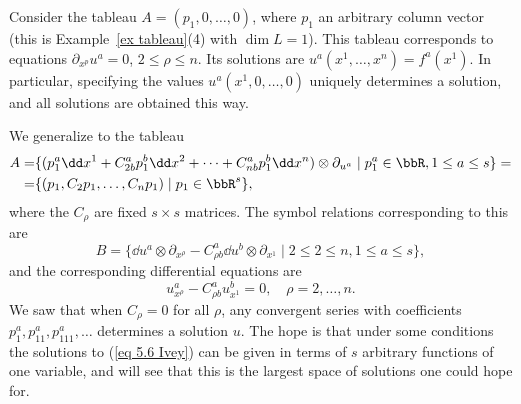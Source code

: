 \begin{example}\label{ex first example Ivey}

Consider the tableau $A=(p_1,0,\ldots,0)$, where $p_1$ an arbitrary column vector (this is Example~\ref{ex tableau}(4) with $\dim L=1$). This tableau corresponds to equations $\partial_{x^p}u^a=0$, $2\leq \rho\leq n$. Its solutions are $u^a(x^1,\ldots,x^n)=f^a(x^1)$. In particular, specifying the values $u^a(x^1,0,\ldots,0)$ uniquely determines a solution, and all solutions are obtained this way.

We generalize to the tableau 
\begin{align}
    A=&\{(p_1^a\dd x^1+C_{2b}^a p_1^b\dd x^2+\cdots +C^a_{nb}p^b_1\dd x^n)\otimes \partial_{u^a}\mid p_1^a\in\bbR,1\leq a\leq s\}= \notag\\
    =& \{(p_1,C_2p_1,\ldots,C_np_1)\mid p_1\in\bbR^s\},\label{eq 5.5 Ivey}
\end{align}
where the $C_\rho$ are fixed $s\times s$ matrices. The symbol relations corresponding to this are 
\[B=\{\dd u^a\otimes \partial_{x^\rho}-C^a_{\rho b}\dd u^b\otimes\partial_{x^1}\mid 2\leq 2\leq n,1\leq a\leq s\},\]
and the corresponding differential equations are 
\[u^a_{x^\rho}-C^a_{\rho b}u^b_{x^1}=0,\quad \rho=2,\ldots,n.\label{eq 5.6 Ivey}\]
We saw that when $C_\rho= 0$ for all $\rho$, any convergent series with coefficients $p_1^a,p_{11}^a,p^a_{111},\ldots $ determines a solution $u$. The hope is that under some conditions the solutions to (\ref{eq 5.6 Ivey}) can be given in terms of $s$ arbitrary functions of one variable, and will see that this is the largest space of solutions one could hope for.


\end{example}
